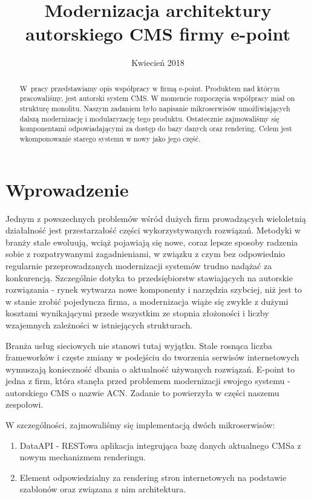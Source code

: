 \documentclass[licencjacka]{pracamgr}
\title{Modernizacja architektury autorskiego CMS firmy e-point}
\date{Kwiecień 2018}
\begin{document}
\maketitle

\begin{abstract}
  W~pracy przedstawiamy opis współpracy w firmą e-point.
  Produktem nad którym pracowaliśmy, jest autorski
  system CMS. W momencie rozpoczęcia współpracy miał on strukturę monolitu.
  Naszym zadaniem było napisanie mikroserwisów umożliwiających
  dalszą modernizację i modularyzację tego produktu. 
  Ostatecznie zajmowaliśmy się komponentami odpowiadającymi za dostęp do bazy danych oraz rendering.
  Celem jest wkomponowanie starego systemu w nowy jako jego część.
\end{abstract}

\tableofcontents

\chapter*{Wprowadzenie}

Jednym z powszechnych problemów wśród dużych firm prowadzących wieloletnią działalność  jest przestarzałość części wykorzystywanych rozwiązań. Metodyki w branży stale ewoluują, wciąż pojawiają się nowe, coraz lepsze sposoby radzenia sobie z rozpatrywanymi zagadnieniami, w związku z czym bez odpowiednio regularnie przeprowadzanych modernizacji systemów trudno nadążać za konkurencją. Szczególnie dotyka to przedsiębiorstw stawiających na autorskie rozwiązania - rynek wytwarza nowe komponenty i narzędzia szybciej, niż jest to w stanie zrobić pojedyncza firma, a modernizacja wiąże się zwykle z dużymi kosztami wynikającymi przede wszystkim ze stopnia złożoności i liczby wzajemnych zależności w istniejących strukturach. 

\vspace{1mm}

Branża usług sieciowych nie stanowi tutaj wyjątku. Stale rosnąca liczba frameworków i częste zmiany w podejściu do tworzenia serwisów internetowych wymuszają konieczność dbania o aktualność używanych rozwiązań. E-point to jedna z firm, która stanęła przed problemem modernizacji swojego systemu - autorskiego CMS o nazwie ACN. Zadanie to powierzyła w części naszemu zespołowi.

\vspace{1mm}

W szczególności, zajmowaliśmy się implementacją dwóch mikroserwisów:
\begin{enumerate}
\item DataAPI - RESTowa aplikacja integrująca bazę danych aktualnego CMSa z nowym mechanizmem renderingu.
\item Element odpowiedzialny za rendering stron internetowych na podstawie szablonów oraz związana z nim architektura.
\end{enumerate}
\end{document}
